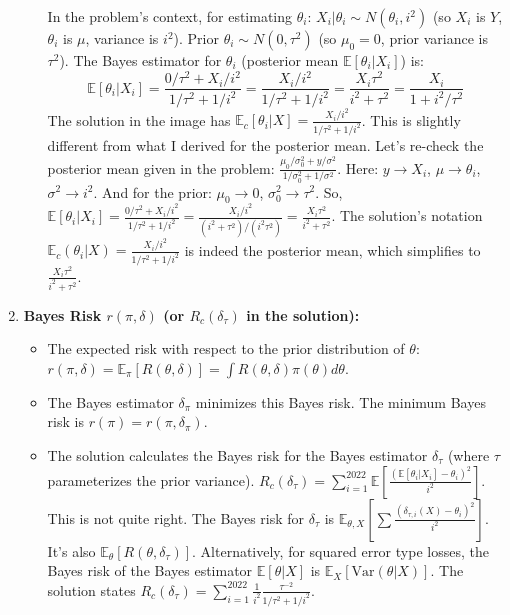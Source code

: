 \begin{enumerate}
\begin{itemize}
In the problem's context, for estimating $\theta_i$:
$X_i | \theta_i \sim N(\theta_i, i^2)$ (so $X_i$ is $Y$, $\theta_i$ is $\mu$, variance is $i^2$).
Prior $\theta_i \sim N(0, \tau^2)$ (so $\mu_0=0$, prior variance is $\tau^2$).
The Bayes estimator for $\theta_i$ (posterior mean $\mathbb{E}[\theta_i | X_i]$) is:
\[
\mathbb{E}[\theta_i | X_i] = \frac{0/\tau^2 + X_i/i^2}{1/\tau^2 + 1/i^2} = \frac{X_i/i^2}{1/\tau^2 + 1/i^2} = \frac{X_i \tau^2}{i^2 + \tau^2} = \frac{X_i}{1 + i^2/\tau^2}
\]The solution in the image has $\mathbb{E}_c[\theta_i | X] = \frac{X_i/i^2}{1/\tau^2 + 1/i^2}$. This is slightly different from what I derived for the posterior mean.
Let's re-check the posterior mean given in the problem: $\frac{\mu_0/\sigma_0^2 + y/\sigma^2}{1/\sigma_0^2 + 1/\sigma^2}$.
Here: $y \rightarrow X_i$, $\mu \rightarrow \theta_i$, $\sigma^2 \rightarrow i^2$. And for the prior: $\mu_0 \rightarrow 0$, $\sigma_0^2 \rightarrow \tau^2$.
So, $\mathbb{E}[\theta_i | X_i] = \frac{0/\tau^2 + X_i/i^2}{1/\tau^2 + 1/i^2} = \frac{X_i/i^2}{(i^2+\tau^2)/(i^2\tau^2)} = \frac{X_i \tau^2}{i^2+\tau^2}$.
The solution's notation $\mathbb{E}_c(\theta_i|X) = \frac{X_i/i^2}{1/\tau^2 + 1/i^2}$ is indeed the posterior mean, which simplifies to $\frac{X_i \tau^2}{i^2+\tau^2}$.
	\end{itemize}
	\item \textbf{Bayes Risk $r(\pi, \delta)$ (or $R_c(\delta_\tau)$ in the solution):}
	\begin{itemize}
		\item The expected risk with respect to the prior distribution of $\theta$: $r(\pi, \delta) = \mathbb{E}_\pi[R(\theta, \delta)] = \int R(\theta, \delta) \pi(\theta) d\theta$.
		\item The Bayes estimator $\delta_\pi$ minimizes this Bayes risk. The minimum Bayes risk is $r(\pi) = r(\pi, \delta_\pi)$.
		\item The solution calculates the Bayes risk for the Bayes estimator $\delta_\tau$ (where $\tau$ parameterizes the prior variance).
$R_c(\delta_\tau) = \sum_{i=1}^{2022} \mathbb{E}\left[\frac{(\mathbb{E}[\theta_i|X_i] - \theta_i)^2}{i^2}\right]$. This is not quite right.
The Bayes risk for $\delta_\tau$ is $\mathbb{E}_{\theta, X} \left[ \sum \frac{(\delta_{\tau,i}(X) - \theta_i)^2}{i^2} \right]$.
It's also $\mathbb{E}_\theta [ R(\theta, \delta_\tau) ]$.
Alternatively, for squared error type losses, the Bayes risk of the Bayes estimator $\mathbb{E}[\theta|X]$ is $\mathbb{E}_X[\text{Var}(\theta|X)]$.
The solution states $R_c(\delta_\tau) = \sum_{i=1}^{2022} \frac{1}{i^2} \frac{\tau^{-2}}{1/\tau^2+1/i^2}$.

\end{itemize}
\end{enumerate}
